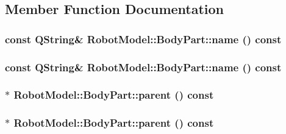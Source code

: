 \subsection{Member Function Documentation}
\hypertarget{class_robot_model_1_1_body_part_a61b6e309edb55f764400dac2b8659a5f}{
\subsubsection[{name}]{\setlength{\rightskip}{0pt plus 5cm}const QString\& RobotModel::BodyPart::name () const}}
\label{class_robot_model_1_1_body_part_a61b6e309edb55f764400dac2b8659a5f}
\hypertarget{class_robot_model_1_1_body_part_a61b6e309edb55f764400dac2b8659a5f}{
\subsubsection[{name}]{\setlength{\rightskip}{0pt plus 5cm}const QString\& RobotModel::BodyPart::name () const}}
\label{class_robot_model_1_1_body_part_a61b6e309edb55f764400dac2b8659a5f}
\hypertarget{class_robot_model_1_1_body_part_abc2ab2a0e1da50aa7465bc1b92ed3abc}{
\subsubsection[{parent}]{$\ast$ RobotModel::BodyPart::parent () const}}
\label{class_robot_model_1_1_body_part_abc2ab2a0e1da50aa7465bc1b92ed3abc}
\hypertarget{class_robot_model_1_1_body_part_abc2ab2a0e1da50aa7465bc1b92ed3abc}{
\subsubsection[{parent}]{$\ast$ RobotModel::BodyPart::parent () const}}
